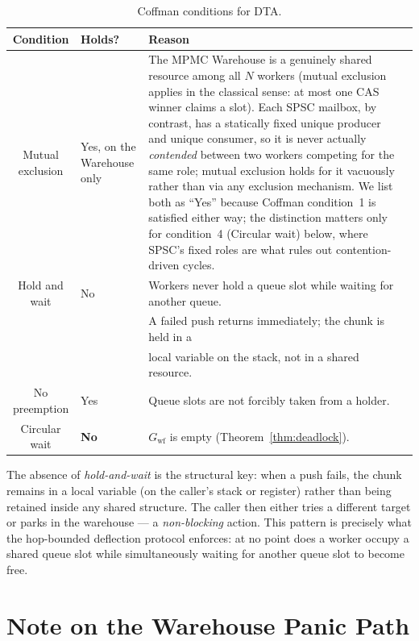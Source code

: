 \documentclass[11pt,a4paper]{report}
\begin{document}
\begin{table}[h]
\centering
\small
\caption{Coffman conditions for DTA.}
\label{tab:coffman}
\begin{tabularx}{\textwidth}{@{}clXl@{}}
\toprule
Condition & Holds? & Reason \\
\midrule
Mutual exclusion
  & Yes, on the Warehouse only
  & The MPMC Warehouse is a genuinely shared resource among all $N$
    workers (mutual exclusion applies in the classical sense: at most
    one CAS winner claims a slot). Each SPSC mailbox, by contrast, has
    a statically fixed unique producer and unique consumer, so it is
    never actually \emph{contended} between two workers competing for
    the same role; mutual exclusion holds for it vacuously rather than
    via any exclusion mechanism. We list both as ``Yes'' because
    Coffman condition~1 is satisfied either way; the distinction
    matters only for condition~4 (Circular wait) below, where SPSC's
    fixed roles are what rules out contention-driven cycles. \\
Hold and wait
  & No
  & Workers never hold a queue slot while waiting for another queue. \\
  & &  A failed push returns immediately; the chunk is held in a \\
  & &  local variable on the stack, not in a shared resource. \\
No preemption
  & Yes
  & Queue slots are not forcibly taken from a holder. \\
Circular wait
  & \textbf{No}
  & $G_{\text{wf}}$ is empty (Theorem~\ref{thm:deadlock}). \\
\bottomrule
\end{tabularx}
\end{table}

The absence of \emph{hold-and-wait} is the structural key: when a
push fails, the chunk remains in a local variable (on the caller's
stack or register) rather than being retained inside any shared
structure.  The caller then either tries a different target or parks
in the warehouse --- a \emph{non-blocking} action.  This pattern is
precisely what the hop-bounded deflection protocol enforces: at no
point does a worker occupy a shared queue slot while simultaneously
waiting for another queue slot to become free.

\section{Note on the Warehouse Panic Path}
\end{document}
